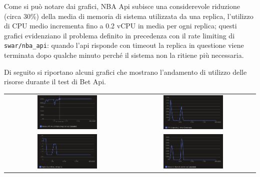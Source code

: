 Come si può notare dai grafici, NBA Api subisce una considerevole riduzione (circa 30\%) della media di memoria di sistema utilizzata da una replica, l'utilizzo di CPU medio incrementa fino a 0.2 vCPU in media per ogni replica; questi grafici evidenziano il problema definito in precedenza con il rate limiting di \texttt{swar/nba\_api}: quando l'api risponde con timeout la replica in questione viene terminata dopo qualche minuto perché il sistema non la ritiene più necessaria.

Di seguito si riportano alcuni grafici che mostrano l'andamento di utilizzo delle risorse durante il test di Bet Api.

\begin{tabular}{ c c }
    \includegraphics[width=0.5\textwidth]{img/load_test/bet-api-mem-avg.png} & \includegraphics[width=0.5\textwidth]{img/load_test/bet-api-cpu-avg.png} \\
    \includegraphics[width=0.5\textwidth]{img/load_test/bet-api-rep-count.png} & \includegraphics[width=0.5\textwidth]{img/load_test/bet-api-rx-sum.png} \\
\end{tabular}

